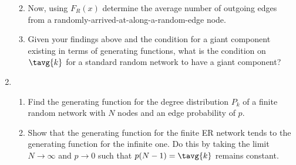 \begin{enumerate}
\begin{enumerate}
         
   \solutionstart


   \solutionend      


       \item
         Now, using $F_{R}(x)$ determine
         the average number of outgoing edges 
         from a randomly-arrived-at-along-a-random-edge node.

         
   \solutionstart


   \solutionend      


       \item
         Given your findings above and the condition for a giant
         component existing in terms of generating functions,
         what is the condition 
         on ${\tavg{k}}$ for a standard random network
         to have a giant component?



         
   \solutionstart


   \solutionend      

       \end{enumerate}

     \item 
       \begin{enumerate}
         
       \item 
         Find the generating function for the degree distribution
         $P_{k}$ of a finite random network with $N$ nodes and
         an edge probability of $p$.

         
   \solutionstart


   \solutionend

       \item 
         Show that the generating function for the finite
         ER network tends to the generating function for 
         the infinite one.  Do this 
         by taking the limit $N\rightarrow \infty$
         and $p\rightarrow 0$ such that $p(N-1)=\tavg{k}$ 
         remains constant.

         
   \solutionstart


\end{enumerate}
\end{enumerate}
